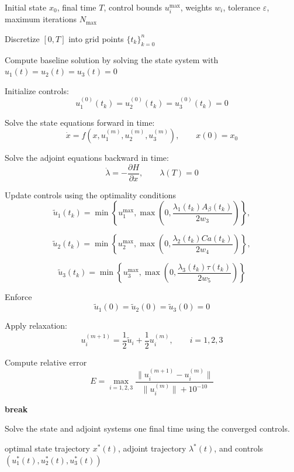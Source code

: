 \documentclass{article}
\begin{document}
\begin{algorithm}[]
\caption{Forward--Backward Sweep Method}
\label{alg:FBSM}
\begin{algorithmic}[1]

\Require Initial state $x_0$, final time $T$, control bounds
$u_i^{\max}$, weights $w_i$, tolerance $\varepsilon$,
maximum iterations $N_{\max}$

\State Discretize $[0,T]$ into grid points $\{t_k\}_{k=0}^{n}$

\State Compute baseline solution by solving the state system with
$u_1(t)=u_2(t)=u_3(t)=0$

\State Initialize controls:
\[
u_1^{(0)}(t_k)=u_2^{(0)}(t_k)=u_3^{(0)}(t_k)=0
\]


    \State Solve the state equations forward in time:
    \[
    \dot{x}=f(x,u_1^{(m)},u_2^{(m)},u_3^{(m)}),
    \qquad
    x(0)=x_0
    \]

    \State Solve the adjoint equations backward in time:
    \[
    \dot{\lambda}
    =
    -\frac{\partial H}{\partial x},
    \qquad
    \lambda(T)=0
    \]


        \State Update controls using the optimality conditions
        \[
        \tilde u_1(t_k)
        =
        \min\!\left\{
        u_1^{\max},
        \max\!\left(
        0,
        \frac{\lambda_1(t_k)A_\beta(t_k)}
        {2w_3}
        \right)
        \right\},
        \]

        \[
        \tilde u_2(t_k)
        =
        \min\!\left\{
        u_2^{\max},
        \max\!\left(
        0,
        \frac{\lambda_2(t_k)Ca(t_k)}
        {2w_4}
        \right)
        \right\},
        \]

        \[
        \tilde u_3(t_k)
        =
        \min\!\left\{
        u_3^{\max},
        \max\!\left(
        0,
        \frac{\lambda_3(t_k)\tau(t_k)}
        {2w_5}
        \right)
        \right\}
        \]

    \EndFor

    \State Enforce
    \[
    \tilde u_1(0)=\tilde u_2(0)=\tilde u_3(0)=0
    \]

    \State Apply relaxation:
    \[
    u_i^{(m+1)}
    =
    \frac{1}{2}\tilde u_i
    +
    \frac{1}{2}u_i^{(m)},
    \qquad i=1,2,3
    \]

    \State Compute relative error
    \[
    E
    =
    \max_{i=1,2,3}
    \frac{\|u_i^{(m+1)}-u_i^{(m)}\|}
         {\|u_i^{(m)}\|+10^{-10}}
    \]

        \State \textbf{break}
    \EndIf

\EndFor

\State Solve the state and adjoint systems one final time using the
converged controls.

\State \Return optimal state trajectory $x^*(t)$, adjoint trajectory
$\lambda^*(t)$, and controls
$\left(u_1^*(t),u_2^*(t),u_3^*(t)\right)$

\end{algorithmic}
\end{algorithm}
\end{document}
